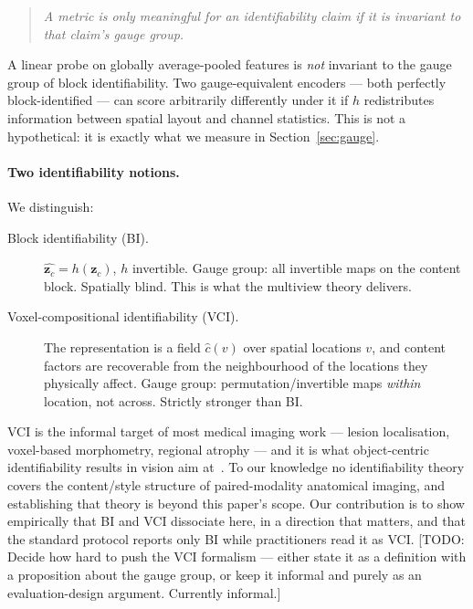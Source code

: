 \documentclass[11pt]{article}
\newcommand{\todo}[1]{{\color{blue}\small[TODO: #1]}}
\newcommand{\zc}{\mathbf{z}_c}
\begin{document}
\begin{quote}
\emph{A metric is only meaningful for an identifiability claim if it is
invariant to that claim's gauge group.}
\end{quote}

A linear probe on globally average-pooled features is \emph{not} invariant to
the gauge group of block identifiability. Two gauge-equivalent encoders --- both
perfectly block-identified --- can score arbitrarily differently under it if
$h$ redistributes information between spatial layout and channel statistics.
This is not a hypothetical: it is exactly what we measure in
Section~\ref{sec:gauge}.

\paragraph{Two identifiability notions.} We distinguish:

\begin{description}
\item[Block identifiability (BI).] $\hat{\zc} = h(\zc)$, $h$ invertible. Gauge
group: all invertible maps on the content block. Spatially blind. This is what
the multiview theory delivers.

\item[Voxel-compositional identifiability (VCI).] The representation is a field
$\hat{c}(v)$ over spatial locations $v$, and content factors are recoverable
from the neighbourhood of the locations they physically affect. Gauge group:
permutation/invertible maps \emph{within} location, not across. Strictly
stronger than BI.
\end{description}

VCI is the informal target of most medical imaging work --- lesion
localisation, voxel-based morphometry, regional atrophy --- and it is what
object-centric identifiability results in vision aim
at~\citep{brendel2023objectcentric}. To our knowledge no identifiability theory
covers the content/style structure of paired-modality anatomical imaging, and
establishing that theory is beyond this paper's scope. Our contribution is to
show empirically that BI and VCI dissociate here, in a direction that matters,
and that the standard protocol reports only BI while practitioners read it as
VCI. \todo{Decide how hard to push the VCI formalism --- either state it as a
definition with a proposition about the gauge group, or keep it informal and
purely as an evaluation-design argument. Currently informal.}

\end{document}
